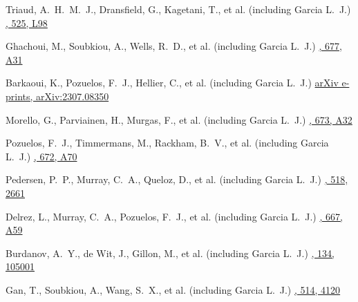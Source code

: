 {Triaud, A.~H.~M.~J., Dransfield, G., Kagetani, T., et al. (including Garcia L.~J.)}
{\href{https://ui.adsabs.harvard.edu/abs/2023MNRAS.525L..98T}{\mnras, 525, L98}}

{Ghachoui, M., Soubkiou, A., Wells, R.~D., et al. (including Garcia L.~J.)}
{\href{https://ui.adsabs.harvard.edu/abs/2023A\&A...677A..31G}{\aap, 677, A31}}

{Barkaoui, K., Pozuelos, F.~J., Hellier, C., et al. (including Garcia L.~J.)}
{\href{https://ui.adsabs.harvard.edu/abs/2023arXiv230708350B}{arXiv e-prints, arXiv:2307.08350}}

{Morello, G., Parviainen, H., Murgas, F., et al. (including Garcia L.~J.)}
{\href{https://ui.adsabs.harvard.edu/abs/2023A\&A...673A..32M}{\aap, 673, A32}}

{Pozuelos, F.~J., Timmermans, M., Rackham, B.~V., et al. (including Garcia L.~J.)}
{\href{https://ui.adsabs.harvard.edu/abs/2023A\&A...672A..70P}{\aap, 672, A70}}

{Pedersen, P.~P., Murray, C.~A., Queloz, D., et al. (including Garcia L.~J.)}
{\href{https://ui.adsabs.harvard.edu/abs/2023MNRAS.518.2661P}{\mnras, 518, 2661}}

{Delrez, L., Murray, C.~A., Pozuelos, F.~J., et al. (including Garcia L.~J.)}
{\href{https://ui.adsabs.harvard.edu/abs/2022A\&A...667A..59D}{\aap, 667, A59}}

{Burdanov, A.~Y., de Wit, J., Gillon, M., et al. (including Garcia L.~J.)}
{\href{https://ui.adsabs.harvard.edu/abs/2022PASP..134j5001B}{\pasp, 134, 105001}}

{Gan, T., Soubkiou, A., Wang, S.~X., et al. (including Garcia L.~J.)}
{\href{https://ui.adsabs.harvard.edu/abs/2022MNRAS.514.4120G}{\mnras, 514, 4120}}


